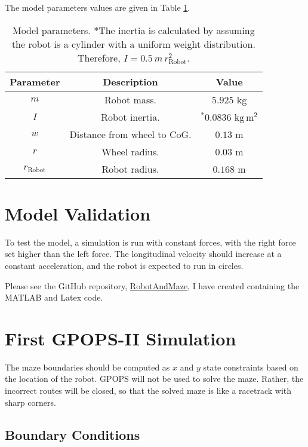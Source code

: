 \documentclass[12pt]{article}
\numberwithin{equation}{section} %
\numberwithin{figure}{section} %
\begin{document}
The model parameters values are given in Table \ref{tab:Model}.
\begin{table}[h!]
	\centering
	\begin{tabular}{c c c}
		\hline
		\textbf{Parameter} & \textbf{Description} & \textbf{Value} \\ \hline
		$m$ & Robot mass. & $5.925$ $\mathrm{kg}$ \\ \hline
		$I$ & Robot inertia. & $^* 0.0836$ $\mathrm{kg \, m^2}$ \\ \hline
		$w$ & Distance from wheel to CoG. & $0.13$ $\mathrm{m}$ \\ \hline
		$r$ & Wheel radius. & $0.03$ $\mathrm{m}$ \\ \hline
		$r_\mathrm{Robot}$ & Robot radius. & $0.168$ $\mathrm{m}$ \\ \hline
	\end{tabular}
	\caption{Model parameters. *The inertia is calculated by assuming the robot is a cylinder with a uniform weight distribution. Therefore, $I = 0.5 \, m \, r_\mathrm{Robot}^2$.}
	\label{tab:Model}
\end{table}

\section{Model Validation}

To test the model, a simulation is run with constant forces, with the right force set higher than the left force. The longitudinal velocity should increase at a constant acceleration, and the robot is expected to run in circles.

Please see the GitHub repository, {\color{blue} \href{https://github.com/CharlvdM/RobotAndMaze}{RobotAndMaze}}, I have created containing the MATLAB and Latex code.


\section{First GPOPS-II Simulation}

The maze boundaries should be computed as $x$ and $y$ state constraints based on the location of the robot. GPOPS will not be used to solve the maze. Rather, the incorrect routes will be closed, so that the solved maze is like a racetrack with sharp corners.

\subsection{Boundary Conditions}
\end{document}
